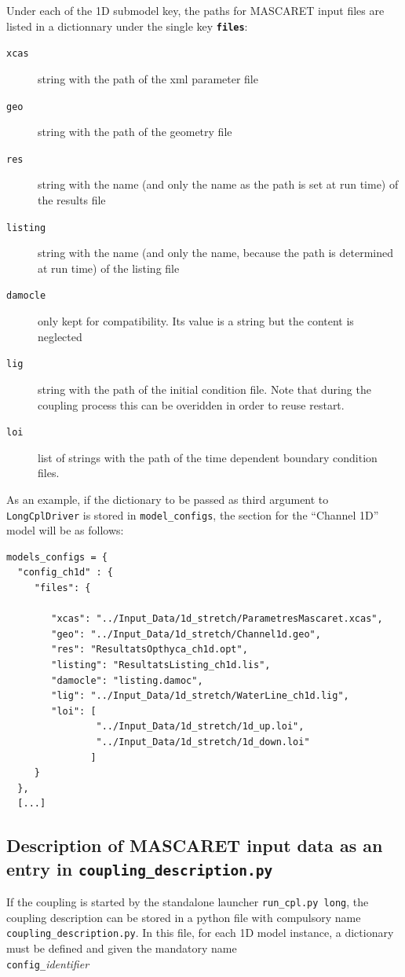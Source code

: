 Under each of the 1D submodel key, the paths for MASCARET input files are listed in a dictionnary under the single key {\bf\texttt{files}}:
\begin{description}
\item[\texttt{xcas}] string with the path of the xml parameter file
\item[\texttt{geo}] string with the path of the geometry file
\item[\texttt{res}] string with the name (and only the name as the path is set at run time) of the
  results file
\item[\texttt{listing}] string with the name (and only the name, because the path is determined at run time) of the listing file
\item[\texttt{damocle}] only kept for compatibility. Its value is a
  string but the content is neglected
\item[\texttt{lig}] string with the path of the initial condition file. Note that during the coupling process this can be overidden in order to reuse restart.
\item[\texttt{loi}] list of strings with the path of the time dependent boundary condition files.
\end{description}

As an example, if the dictionary to be passed as third argument to
\texttt{LongCplDriver} is stored in \texttt{model\_configs}, the
section for the ``Channel 1D'' model will be as follows:
\begin{verbatim}
models_configs = {
  "config_ch1d" : {
     "files": {

        "xcas": "../Input_Data/1d_stretch/ParametresMascaret.xcas",
        "geo": "../Input_Data/1d_stretch/Channel1d.geo",
        "res": "ResultatsOpthyca_ch1d.opt",
        "listing": "ResultatsListing_ch1d.lis",
        "damocle": "listing.damoc",
        "lig": "../Input_Data/1d_stretch/WaterLine_ch1d.lig",
        "loi": [
                "../Input_Data/1d_stretch/1d_up.loi",
                "../Input_Data/1d_stretch/1d_down.loi"
               ]
     }
  },
  [...]
\end{verbatim}

\subsection{Description of MASCARET input data as an entry in \texttt{coupling\_description.py}}
If the coupling is started by the standalone launcher
\texttt{run\_cpl.py long}, the coupling description can be stored in
a python file with compulsory name \texttt{coupling\_description.py}.
In this file, for each 1D model instance, a dictionary must be defined and given
the mandatory name\\
\texttt{config\_}{\em identifier}

